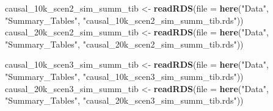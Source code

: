 \documentclass[
]{article}
\newenvironment{Shaded}{\begin{snugshade}}{\end{snugshade}}
\newcommand{\AttributeTok}[1]{\textcolor[rgb]{0.13,0.29,0.53}{#1}}
\newcommand{\FunctionTok}[1]{\textcolor[rgb]{0.13,0.29,0.53}{\textbf{#1}}}
\newcommand{\NormalTok}[1]{#1}
\newcommand{\OtherTok}[1]{\textcolor[rgb]{0.56,0.35,0.01}{#1}}
\newcommand{\StringTok}[1]{\textcolor[rgb]{0.31,0.60,0.02}{#1}}
\begin{document}
\begin{Shaded}
\begin{Highlighting}[]
\NormalTok{causal\_10k\_scen2\_sim\_summ\_tib }\OtherTok{\textless{}{-}} \FunctionTok{readRDS}\NormalTok{(}\AttributeTok{file =} \FunctionTok{here}\NormalTok{(}\StringTok{"Data"}\NormalTok{, }\StringTok{"Summary\_Tables"}\NormalTok{, }\StringTok{"causal\_10k\_scen2\_sim\_summ\_tib.rds"}\NormalTok{))}
\NormalTok{causal\_20k\_scen2\_sim\_summ\_tib }\OtherTok{\textless{}{-}} \FunctionTok{readRDS}\NormalTok{(}\AttributeTok{file =} \FunctionTok{here}\NormalTok{(}\StringTok{"Data"}\NormalTok{, }\StringTok{"Summary\_Tables"}\NormalTok{, }\StringTok{"causal\_20k\_scen2\_sim\_summ\_tib.rds"}\NormalTok{))}

\NormalTok{causal\_10k\_scen3\_sim\_summ\_tib }\OtherTok{\textless{}{-}} \FunctionTok{readRDS}\NormalTok{(}\AttributeTok{file =} \FunctionTok{here}\NormalTok{(}\StringTok{"Data"}\NormalTok{, }\StringTok{"Summary\_Tables"}\NormalTok{, }\StringTok{"causal\_10k\_scen3\_sim\_summ\_tib.rds"}\NormalTok{))}
\NormalTok{causal\_20k\_scen3\_sim\_summ\_tib }\OtherTok{\textless{}{-}} \FunctionTok{readRDS}\NormalTok{(}\AttributeTok{file =} \FunctionTok{here}\NormalTok{(}\StringTok{"Data"}\NormalTok{, }\StringTok{"Summary\_Tables"}\NormalTok{, }\StringTok{"causal\_20k\_scen3\_sim\_summ\_tib.rds"}\NormalTok{))}
\end{Highlighting}
\end{Shaded}
\end{document}
